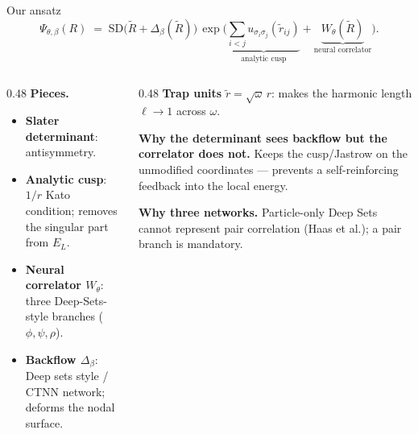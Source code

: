 \documentclass[10pt,aspectratio=169]{beamer}
\newcommand{\ours}[1]{\textcolor{ourwork}{\textbf{#1}}}
\begin{document}
\begin{frame}{Our ansatz}
\small
\[
  \Psi_{\theta,\beta}(R) \;=\; \mathrm{SD}\bigl(\tilde R + \Delta_\beta(\tilde R)\bigr)\,
  \exp\!\Big(\underbrace{\textstyle\sum_{i<j}\!u_{\sigma_i\sigma_j}(\tilde r_{ij})}_{\text{analytic cusp}}
  + \underbrace{W_\theta(\tilde R)}_{\text{neural correlator}}\Big).
\]
\begin{columns}[T,onlytextwidth]
\begin{column}{0.48\textwidth}
\textbf{Pieces.}
\begin{itemize}\setlength\itemsep{1pt}\small
\item \ours{Slater determinant}: antisymmetry.
\item \ours{Analytic cusp}: $1/r$ Kato condition; removes the singular part from $E_L$.
\item \ours{Neural correlator $W_\theta$}: three Deep-Sets-style branches ($\phi,\psi,\rho$).
\item \ours{Backflow $\Delta_\beta$}: Deep sets style / CTNN network; deforms the nodal surface.
\end{itemize}
\end{column}
\begin{column}{0.48\textwidth}
\textbf{Trap units} $\tilde r = \sqrt\omega\,r$: makes the harmonic length $\ell\!\to\!1$ across $\omega$.

\vspace{2pt}
\textbf{Why the determinant sees backflow but the correlator does not.} Keeps the cusp/Jastrow on the
unmodified coordinates --- prevents a self-reinforcing feedback into the local energy.

\vspace{2pt}
\textbf{Why three networks.} Particle-only Deep Sets cannot represent pair correlation
(Haas et al.); a pair branch is mandatory.
\end{column}
\end{columns}
\end{frame}
\end{document}
